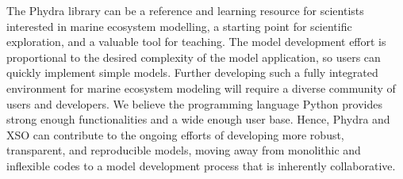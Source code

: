 \documentclass[gmd, manuscript]{copernicus}
\begin{document}
The Phydra library can be a reference and learning resource for scientists interested in marine ecosystem modelling, a starting point for scientific exploration, and a valuable tool for teaching. The model development effort is proportional to the desired complexity of the model application, so users can quickly implement simple models. Further developing such a fully integrated environment for marine ecosystem modeling will require a diverse community of users and developers. We believe the programming language Python provides strong enough functionalities and a wide enough user base. Hence, Phydra and XSO can contribute to the ongoing efforts of developing more robust, transparent, and reproducible models, moving away from monolithic and inflexible codes to a model development process that is inherently collaborative.


















\appendix
\end{document}
